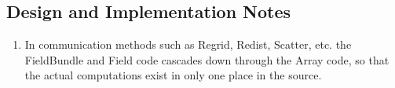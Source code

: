 
\subsection{Design and Implementation Notes}

\begin{enumerate}

\item In communication methods such as Regrid, Redist, Scatter, etc. 
the FieldBundle and Field code cascades down through the Array code, so 
that the actual computations exist in only one place in the source.

\end{enumerate}
